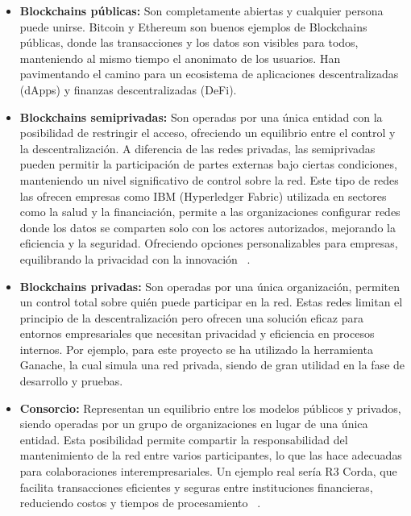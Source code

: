 \begin{itemize}
\item \textbf{Blockchains públicas:} Son completamente abiertas y cualquier persona puede unirse. Bitcoin y Ethereum son buenos ejemplos de Blockchains públicas, donde las transacciones y los datos son visibles para todos, manteniendo al mismo tiempo el anonimato de los usuarios. Han pavimentando el camino para un ecosistema de aplicaciones descentralizadas (dApps) y finanzas descentralizadas (DeFi).

\item \textbf{Blockchains semiprivadas:} Son operadas por una única entidad con la posibilidad de restringir el acceso, ofreciendo un equilibrio entre el control y la descentralización. A diferencia de las redes privadas, las semiprivadas pueden permitir la participación de partes externas bajo ciertas condiciones, manteniendo un nivel significativo de control sobre la red.
Este tipo de redes las ofrecen empresas como IBM (Hyperledger Fabric) utilizada en sectores como la salud y la financiación, permite a las organizaciones configurar redes donde los datos se comparten solo con los actores autorizados, mejorando la eficiencia y la seguridad. Ofreciendo opciones personalizables para empresas, equilibrando la privacidad con la innovación ~\cite{Hyperledger}.

\item \textbf{Blockchains privadas:} Son operadas por una única organización, permiten un control total sobre quién puede participar en la red. Estas redes limitan el principio de la descentralización pero ofrecen una solución eficaz para entornos empresariales que necesitan privacidad y eficiencia en procesos internos.
Por ejemplo, para este proyecto se ha utilizado la herramienta Ganache, la cual simula una red privada, siendo de gran utilidad en la fase de desarrollo y pruebas.

\item \textbf{Consorcio:} Representan un equilibrio entre los modelos públicos y privados, siendo operadas por un grupo de organizaciones en lugar de una única entidad. Esta posibilidad permite compartir la responsabilidad del mantenimiento de la red entre varios participantes, lo que las hace adecuadas para colaboraciones interempresariales. 
Un ejemplo real sería R3 Corda, que facilita transacciones eficientes y seguras entre instituciones financieras, reduciendo costos y tiempos de procesamiento ~\cite{R3Corda}.

\end{itemize} 


